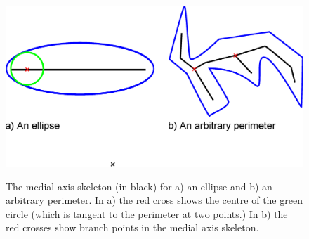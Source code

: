 \documentclass[pdftex,10pt,a4paper]{article}
\begin{document}
\begin{figure}[t] 
\centering
\scalebox{0.5} 
{\includegraphics{medial.eps}}
\caption{The medial axis skeleton (in black) for a) an  ellipse and b) an arbitrary perimeter. In a) the red cross shows the centre of the green circle (which is tangent to the perimeter at two points.) In b) the red crosses show branch points in the medial axis skeleton.}\label{fig:medial}
\end{figure} 
\end{document}
